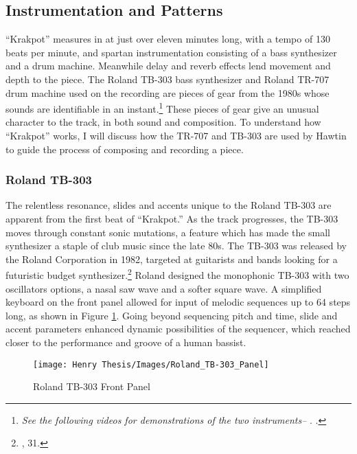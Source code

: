 \documentclass[12pt,twoside]{reedthesis}
\begin{document}
\subsection{Instrumentation and Patterns}

``Krakpot'' measures in at just over eleven minutes long, with a tempo of 130 beats per minute, and spartan instrumentation consisting of a bass synthesizer and a drum machine. Meanwhile delay and reverb effects lend movement and depth to the piece. The Roland TB-303 bass synthesizer and Roland TR-707 drum machine used on the recording are pieces of gear from the 1980s whose sounds are identifiable in an instant.\footnote{\emph{See the following videos for demonstrations of the two instruments--} \cite{deathbydinsyncRolandTB303HQ2016}. \cite{zibbyboneRolandTR707Factory2017}.}  These pieces of gear give an unusual character to the track, in both sound and composition. To understand how ``Krakpot'' works, I will discuss how the TR-707 and TB-303 are used by Hawtin to guide the process of composing and recording a piece.

\subsubsection{Roland TB-303}

The relentless resonance, slides and accents unique to the Roland TB-303 are apparent from the first beat of ``Krakpot.'' As the track progresses, the TB-303 moves through constant sonic mutations, a feature which has made the small synthesizer a staple of club music since the late 80s. The TB-303 was released by the Roland Corporation in 1982, targeted at guitarists and bands looking for a futuristic budget synthesizer.\footnote{\cite{reynoldsGenerationEcstasyWorld1998}, 31.}  Roland designed the monophonic TB-303 with two oscillators options, a nasal saw wave and a softer square wave. A simplified keyboard on the front panel allowed for input of melodic sequences up to 64 steps long, as shown in Figure \ref{fig:tb303}. Going beyond sequencing pitch and time, slide and accent parameters enhanced dynamic possibilities of the sequencer, which reached closer to the performance and groove of a human bassist.

\begin{figure}[htbp]
\begin{centering} 
\texttt{[image: Henry Thesis/Images/Roland\_TB-303\_Panel]}
\caption{Roland TB-303 Front Panel}
\label{fig:tb303}
\end{centering} 
\end{figure}
\end{document}
